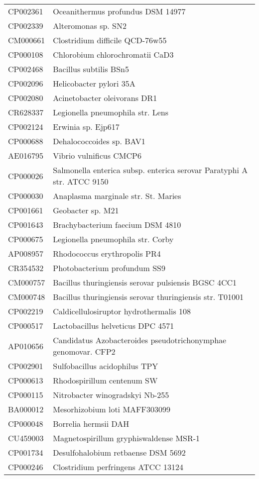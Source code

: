 \begin{longtable}{ll}
CP002361 & Oceanithermus profundus DSM 14977\\
CP002339 & Alteromonas sp. SN2\\
CM000661 & Clostridium difficile QCD-76w55\\
CP000108 & Chlorobium chlorochromatii CaD3\\
CP002468 & Bacillus subtilis BSn5\\
CP002096 & Helicobacter pylori 35A\\
CP002080 & Acinetobacter oleivorans DR1\\
CR628337 & Legionella pneumophila str. Lens\\
CP002124 & Erwinia sp. Ejp617\\
CP000688 & Dehalococcoides sp. BAV1\\
AE016795 & Vibrio vulnificus CMCP6\\
CP000026 & Salmonella enterica subsp. enterica serovar Paratyphi A str. ATCC 9150\\
CP000030 & Anaplasma marginale str. St. Maries\\
CP001661 & Geobacter sp. M21\\
CP001643 & Brachybacterium faecium DSM 4810\\
CP000675 & Legionella pneumophila str. Corby\\
AP008957 & Rhodococcus erythropolis PR4\\
CR354532 & Photobacterium profundum SS9\\
CM000757 & Bacillus thuringiensis serovar pulsiensis BGSC 4CC1\\
CM000748 & Bacillus thuringiensis serovar thuringiensis str. T01001\\
CP002219 & Caldicellulosiruptor hydrothermalis 108\\
CP000517 & Lactobacillus helveticus DPC 4571\\
AP010656 & Candidatus Azobacteroides pseudotrichonymphae genomovar. CFP2\\
CP002901 & Sulfobacillus acidophilus TPY\\
CP000613 & Rhodospirillum centenum SW\\
CP000115 & Nitrobacter winogradskyi Nb-255\\
BA000012 & Mesorhizobium loti MAFF303099\\
CP000048 & Borrelia hermsii DAH\\
CU459003 & Magnetospirillum gryphiswaldense MSR-1\\
CP001734 & Desulfohalobium retbaense DSM 5692\\
CP000246 & Clostridium perfringens ATCC 13124\\

\end{longtable}

